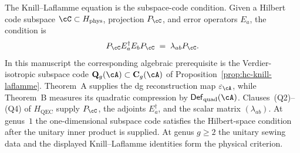 \begin{remark}
\label{rem:thqg-knill-laflamme-boundary}
The Knill--Laflamme equation is the subspace-code condition.  Given a
Hilbert code subspace
$\cC\subset H_{\mathrm{phys}}$, projection $P_\cC$, and error
operators $E_a$, the condition is
\[
P_\cC E_a^\dagger E_b P_\cC
\;=\;
\lambda_{ab}P_\cC .
\]
In this manuscript the corresponding algebraic prerequisite is the
Verdier-isotropic subspace code
$\mathbf Q_g(\cA)\subset \mathbf C_g(\cA)$
of Proposition~\ref{prop:hc-knill-laflamme}.  Theorem~A supplies the
dg reconstruction map $\varepsilon_\cA$, while Theorem~B measures its
quadratic compression by
$\mathsf{Def}_{\mathrm{quad}}(\cA)$.  Clauses~\textup{(Q2)--(Q4)} of
$H_{\mathrm{QEC}}$ supply $P_\cC$, the adjoints $E_a^\dagger$, and
the scalar matrix $(\lambda_{ab})$.  At genus~$1$ the one-dimensional
subspace code satisfies the Hilbert-space condition after the unitary
inner product is supplied.  At genus $g\ge2$ the unitary sewing data
and the displayed Knill--Laflamme identities form the physical
criterion.
\end{remark}

